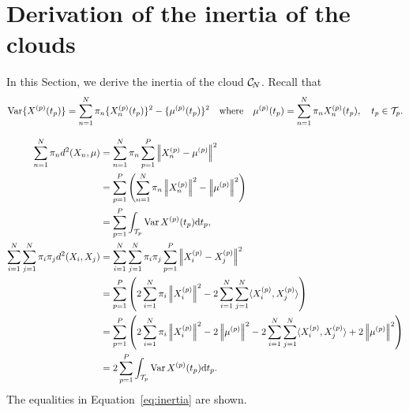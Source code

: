 \section{Derivation of the inertia of the clouds} %
\label{sec:derivation_of_the_inertia_of_the_clouds}

In this Section, we derive the inertia of the cloud $\mathcal{C}_{\!N}$. Recall that 
\begin{equation}\label{eq:var_appendix}
    \operatorname{Var}\{X^{(p)}(t_p)\} = \sum_{n = 1}^N \pi_n \{X_n^{(p)}(t_p)\}^2 - \{\mu^{(p)}(t_p)\}^2 \quad\text{where}\quad \mu^{(p)}(t_p) = \sum_{n = 1}^N \pi_nX_n^{(p)}(t_p), \quad t_p \in \mathcal{T}_{p}.
\end{equation}

\begin{align*}
    \sum_{n = 1}^N \pi_n d^2(X_n, \mu) &= \sum_{n = 1}^N \pi_n \sum_{p = 1}^P\normLp{\Xnp - \mu^{(p)}}^2\\
    &= \sum_{p = 1}^P\left(\sum_{n = 1}^N \pi_n \normLp{\Xnp}^2 - \normLp{\mup{p}}^2\right) \\
    &= \sum_{p = 1}^P \int_{\TT{p}}\Var{\Xp{p}(t_p)} \dd t_p, \\
\sum_{i = 1}^N \sum_{j = 1}^N \pi_i \pi_j d^2(X_i, X_j) &= \sum_{i = 1}^N \sum_{j = 1}^N \pi_i \pi_j \sum_{p = 1}^P \normLp{\Xp{p}_i - \Xp{p}_j}^2\\
    &= \sum_{p = 1}^P \left(2\sum_{i = 1}^N \pi_i\normLp{\Xp{p}_i}^2 - 2\sum_{i = 1}^N \sum_{j = 1}^N \inLp{\Xp{p}_i}{\Xp{p}_j}\right) \\
    &= \sum_{p = 1}^P \left(2\sum_{i = 1}^N \pi_i\normLp{\Xp{p}_i}^2 - 2\normLp{\mup{p}}^2 - 2\sum_{i = 1}^N \sum_{j = 1}^N \inLp{\Xp{p}_i}{\Xp{p}_j} + 2\normLp{\mup{p}}^2\right) \\
    &= 2\sum_{p = 1}^P \int_{\TT{p}}\Var{\Xp{p}(t_p)} \dd t_p.
\end{align*}
The equalities in Equation~\eqref{eq:inertia} are shown.


